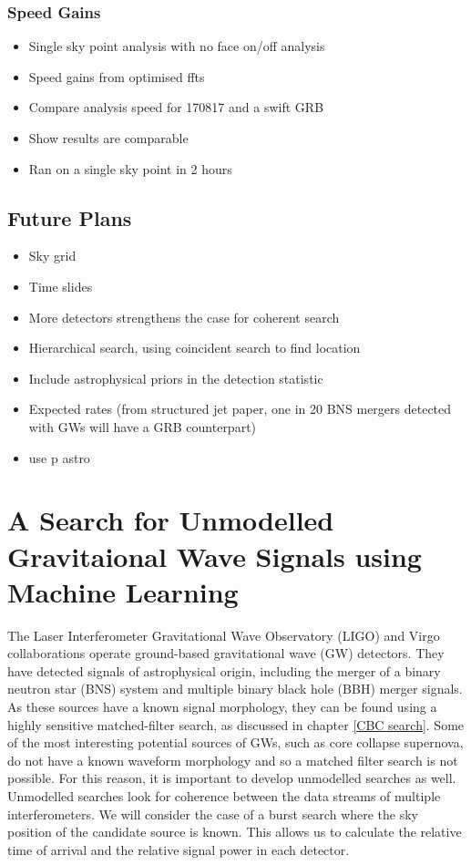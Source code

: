 \documentclass[11pt]{cuthesis}
\begin{document}
\subsection{Speed Gains}
\begin{itemize}
\item Single sky point analysis with no face on/off analysis
\item Speed gains from optimised ffts
\item Compare analysis speed for 170817 and a swift GRB
\item Show results are comparable 
\item Ran on a single sky point in 2 hours 
\end{itemize}

\section{Future Plans}
\begin{itemize}
\item Sky grid
\item Time slides
\item More detectors strengthens the case for coherent search
\item Hierarchical search, using coincident search to find location 
\item Include astrophysical priors in the detection statistic
\item Expected rates (from structured jet paper, one in 20 BNS mergers detected with GWs will have a GRB counterpart)
\item use p astro
\end{itemize}


\chapter{A Search for Unmodelled Gravitaional Wave Signals using Machine Learning} \label{chap: mva}

The Laser Interferometer Gravitational Wave Observatory (LIGO) and Virgo collaborations operate ground-based gravitational wave (GW) detectors. They have detected signals of astrophysical origin, including the merger of a binary neutron star (BNS) system and multiple binary black hole (BBH) merger signals. As these sources have a known signal morphology, they can be found using a highly sensitive matched-filter search, as discussed in chapter \ref{CBC search}. Some of the most interesting potential sources of GWs, such as core collapse supernova, do not have a known waveform morphology and so a matched filter search is not possible. For this reason, it is important to develop unmodelled searches as well. Unmodelled searches look for coherence between the data streams of multiple interferometers. We will consider the case of a burst search where the sky position of the candidate source is known. This allows us to calculate the relative time of arrival and the relative signal power in each detector.
\end{document}
